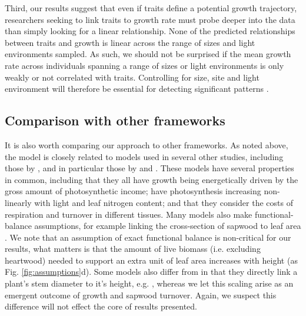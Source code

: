 \documentclass[a4paper,11pt]{article}
\begin{document}
Third, our results suggest that even if traits define a potential growth trajectory, researchers seeking to link traits to growth rate must probe deeper into the data than simply looking for a linear relationship. None of the predicted relationships between traits and growth is linear across the range of sizes and light environments sampled. As such,  we should not be surprised if the mean growth rate across individuals spanning a range of sizes or light environments is only weakly or not correlated with traits.  Controlling for size, site and light environment will therefore be essential for detecting significant patterns \citep[e.g.][]{Gibert-2016}.

\subsection{Comparison with other frameworks}

It is also worth comparing our approach to other frameworks. As noted above, the {\plant} model is closely related to models used in several other studies, including those by \citet{Givnish-1988, Yokozawa-1995, Makela-1997, King-1999, King-2005, Moorcroft-2001, Li-2014}, and in particular those by \citet{Makela-1997} and \citet{Moorcroft-2001}. These models have several properties in common, including that they all have growth being energetically driven by the gross amount of photosynthetic income; have photosynthesis increasing non-linearly with light and leaf nitrogen content; and that they consider the costs of respiration and turnover in different tissues. Many models also make functional-balance assumptions, for example linking the cross-section of sapwood to leaf area \citep{Givnish-1988, Yokozawa-1995, Makela-1997, King-2005, Moorcroft-2001}. We note that an assumption of exact functional balance is non-critical for our results, what matters is that the amount of live biomass (i.e. excluding heartwood) needed to support an extra unit of leaf area increases with height (as Fig. \ref{fig:assumptions}d). Some models also differ from in that they directly link a plant's stem diameter to it's height, e.g. \citet{Yokozawa-1995, King-1999, Moorcroft-2001, Li-2014}, whereas we let this scaling arise as an emergent outcome of growth and sapwood turnover. Again, we suspect this difference will not effect the core of results presented.
\end{document}

